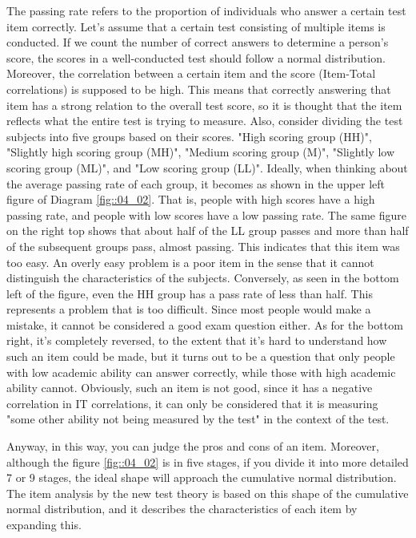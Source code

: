 \documentclass{ltjsbook}
\begin{document}
The passing rate refers to the proportion of individuals who answer a certain test item correctly. Let's assume that a certain test consisting of multiple items is conducted. If we count the number of correct answers to determine a person's score, the scores in a well-conducted test should follow a normal distribution. Moreover, the correlation between a certain item and the score (Item-Total correlations) is supposed to be high. This means that correctly answering that item has a strong relation to the overall test score, so it is thought that the item reflects what the entire test is trying to measure. Also, consider dividing the test subjects into five groups based on their scores. "High scoring group (HH)", "Slightly high scoring group (MH)", "Medium scoring group (M)", "Slightly low scoring group (ML)", and "Low scoring group (LL)". Ideally, when thinking about the average passing rate of each group, it becomes as shown in the upper left figure of Diagram \ref{fig::04_02}. That is, people with high scores have a high passing rate, and people with low scores have a low passing rate. The same figure on the right top shows that about half of the LL group passes and more than half of the subsequent groups pass, almost passing. This indicates that this item was too easy. An overly easy problem is a poor item in the sense that it cannot distinguish the characteristics of the subjects. Conversely, as seen in the bottom left of the figure, even the HH group has a pass rate of less than half. This represents a problem that is too difficult. Since most people would make a mistake, it cannot be considered a good exam question either. As for the bottom right, it's completely reversed, to the extent that it's hard to understand how such an item could be made, but it turns out to be a question that only people with low academic ability can answer correctly, while those with high academic ability cannot. Obviously, such an item is not good, since it has a negative correlation in IT correlations, it can only be considered that it is measuring "some other ability not being measured by the test" in the context of the test.



Anyway, in this way, you can judge the pros and cons of an item. Moreover, although the figure \ref{fig::04_02} is in five stages, if you divide it into more detailed 7 or 9 stages, the ideal shape will approach the cumulative normal distribution. The item analysis by the new test theory is based on this shape of the cumulative normal distribution, and it describes the characteristics of each item by expanding this.
\end{document}
